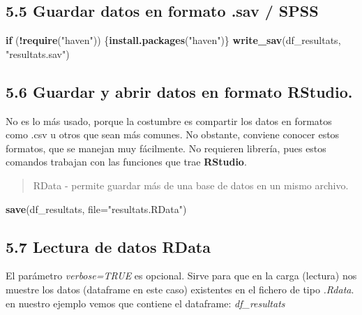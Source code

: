 \documentclass[
]{article}
\newenvironment{Shaded}{\begin{snugshade}}{\end{snugshade}}
\newcommand{\AttributeTok}[1]{\textcolor[rgb]{0.13,0.29,0.53}{#1}}
\newcommand{\ControlFlowTok}[1]{\textcolor[rgb]{0.13,0.29,0.53}{\textbf{#1}}}
\newcommand{\FunctionTok}[1]{\textcolor[rgb]{0.13,0.29,0.53}{\textbf{#1}}}
\newcommand{\NormalTok}[1]{#1}
\newcommand{\SpecialCharTok}[1]{\textcolor[rgb]{0.81,0.36,0.00}{\textbf{#1}}}
\newcommand{\StringTok}[1]{\textcolor[rgb]{0.31,0.60,0.02}{#1}}
\begin{document}
\hypertarget{guardar-datos-en-formato-.sav-spss}{%
\subsection{5.5 Guardar datos en formato .sav /
SPSS}\label{guardar-datos-en-formato-.sav-spss}}

\begin{Shaded}
\begin{Highlighting}[]
\ControlFlowTok{if}\NormalTok{ (}\SpecialCharTok{!}\FunctionTok{require}\NormalTok{(}\StringTok{"haven"}\NormalTok{)) \{}\FunctionTok{install.packages}\NormalTok{(}\StringTok{"haven"}\NormalTok{)\}}
\FunctionTok{write\_sav}\NormalTok{(df\_resultats, }\StringTok{"resultats.sav"}\NormalTok{)}
\end{Highlighting}
\end{Shaded}

\hypertarget{guardar-y-abrir-datos-en-formato-rstudio.}{%
\subsection{5.6 Guardar y abrir datos en formato
RStudio.}\label{guardar-y-abrir-datos-en-formato-rstudio.}}

No es lo más usado, porque la costumbre es compartir los datos en
formatos como .csv u otros que sean más comunes. No obstante, conviene
conocer estos formatos, que se manejan muy fácilmente. No requieren
librería, pues estos comandos trabajan con las funciones que trae
\textbf{RStudio}.

\begin{quote}
RData - permite guardar más de una base de datos en un mismo archivo.
\end{quote}

\begin{Shaded}
\begin{Highlighting}[]
\FunctionTok{save}\NormalTok{(df\_resultats, }\AttributeTok{file=}\StringTok{"resultats.RData"}\NormalTok{)}
\end{Highlighting}
\end{Shaded}

\hypertarget{lectura-de-datos-rdata}{%
\subsection{5.7 Lectura de datos RData}\label{lectura-de-datos-rdata}}

El parámetro \emph{verbose=TRUE} es opcional. Sirve para que en la carga
(lectura) nos muestre los datos (dataframe en este caso) existentes en
el fichero de tipo \emph{.Rdata}. en nuestro ejemplo vemos que contiene
el dataframe: \emph{df\_resultats}
\end{document}
